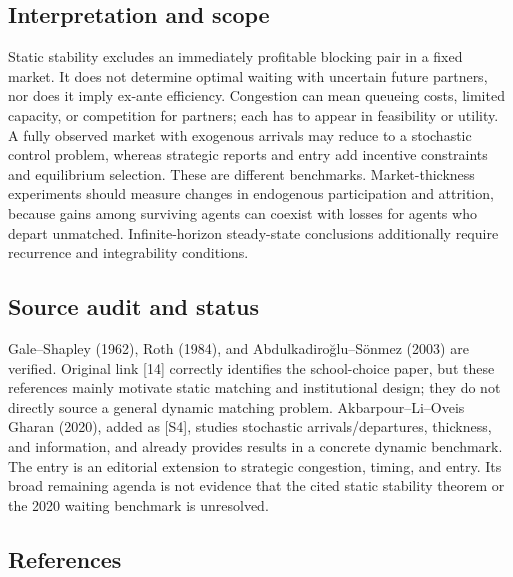 \documentclass[11pt,a4paper]{article}
\begin{document}
\subsection*{Interpretation and scope}

Static stability excludes an immediately profitable blocking pair in a fixed market. It does not determine optimal waiting with uncertain future partners, nor does it imply ex-ante efficiency. Congestion can mean queueing costs, limited capacity, or competition for partners; each has to appear in feasibility or utility. A fully observed market with exogenous arrivals may reduce to a stochastic control problem, whereas strategic reports and entry add incentive constraints and equilibrium selection. These are different benchmarks. Market-thickness experiments should measure changes in endogenous participation and attrition, because gains among surviving agents can coexist with losses for agents who depart unmatched. Infinite-horizon steady-state conclusions additionally require recurrence and integrability conditions.

\subsection*{Source audit and status}

Gale--Shapley (1962), Roth (1984), and Abdulkadiroğlu--Sönmez (2003) are verified. Original link [14] correctly identifies the school-choice paper, but these references mainly motivate static matching and institutional design; they do not directly source a general dynamic matching problem. Akbarpour--Li--Oveis Gharan (2020), added as [S4], studies stochastic arrivals/departures, thickness, and information, and already provides results in a concrete dynamic benchmark. The entry is an editorial extension to strategic congestion, timing, and entry. Its broad remaining agenda is not evidence that the cited static stability theorem or the 2020 waiting benchmark is unresolved.

\subsection*{References}
\end{document}
